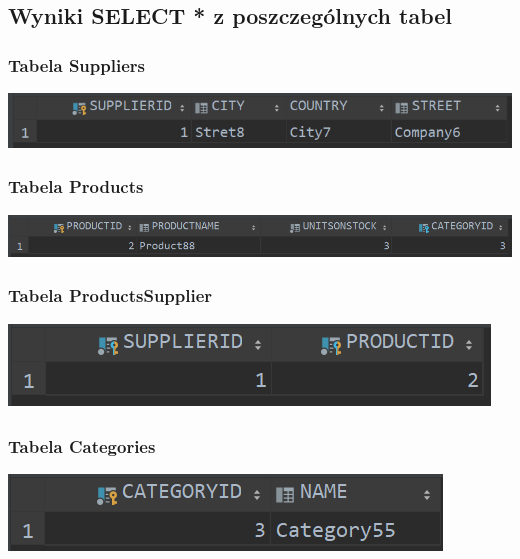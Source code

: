 \documentclass[a4paper, 11pt]{article}
\begin{document}
    \subsection{Wyniki SELECT * z poszczególnych tabel}

    \subsubsection{Tabela Suppliers}
    \begin{center}
        \includegraphics{images/point11/SelectSuppliers.png}
    \end{center}

    \subsubsection{Tabela Products}
    \begin{center}
        \includegraphics[scale=0.85]{images/point11/SelectProducts.png}
    \end{center}

    \subsubsection{Tabela ProductsSupplier}
    \begin{center}
        \includegraphics{images/point11/SelectProductsSupplier.png}
    \end{center}

    \subsubsection{Tabela Categories}
    \begin{center}
        \includegraphics[scale=0.85]{images/point11/SelectCategories.png}
    \end{center}
\end{document}
